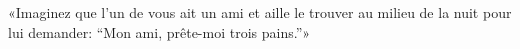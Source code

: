 \encetemps \jesusdisciples
	«Imaginez que l’un de vous ait un ami
	et aille le trouver au milieu de la nuit pour lui demander:
	“Mon ami, prête-moi trois pains.”»
